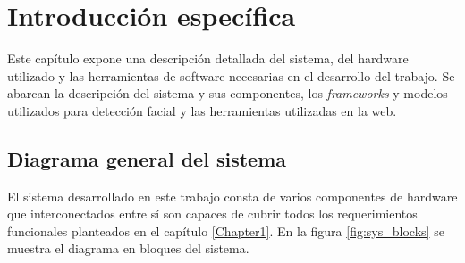 \chapter{Introducción específica} %

\label{Chapter2} %

Este capítulo expone una descripción detallada del sistema, del hardware utilizado y las herramientas de  software necesarias en el desarrollo del trabajo. Se abarcan la descripción del sistema y sus componentes, los \textit{frameworks} y modelos utilizados para detección facial y las herramientas utilizadas en la web.

\section{Diagrama general del sistema}
El sistema desarrollado en este trabajo consta de varios componentes de hardware que interconectados entre sí son capaces de cubrir todos los requerimientos funcionales planteados en el capítulo \ref{Chapter1}. En la figura \ref{fig:sys_blocks} se muestra el diagrama en bloques del sistema.

